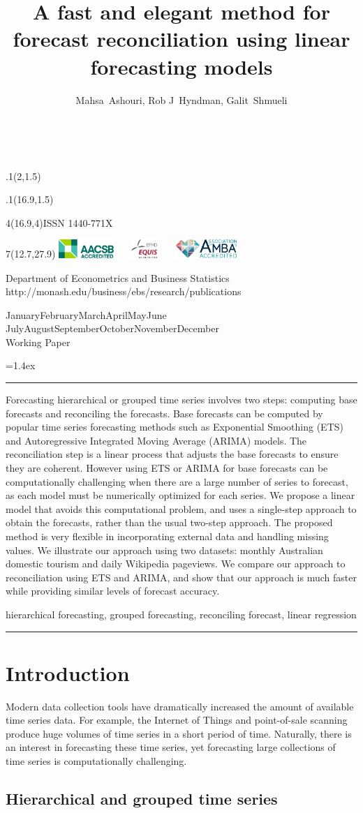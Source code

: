 \documentclass[11pt,a4paper,]{article}
\title{A fast and elegant method for forecast reconciliation using linear forecasting models}
\author{Mahsa~Ashouri, Rob J~Hyndman, Galit~Shmueli}
\date{\sf\Date~\Month~\Year}
\makeatletter
\def\Date{\number\day}
\def\Month{\ifcase\month\or
 January\or February\or March\or April\or May\or June\or
 July\or August\or September\or October\or November\or December\fi}
\def\Year{\number\year}
\def\showjel{{\large\textsf{\textbf{JEL classification:}}~\@jel}}
\def\cover{{\sffamily\setcounter{page}{0}
        \thispagestyle{empty}
        \placefig{2}{1.5}{width=5cm}{monash2}
        \placefig{16.9}{1.5}{width=2.1cm}{MBusSchool}
        \begin{textblock}{4}(16.9,4)ISSN 1440-771X\end{textblock}
        \begin{textblock}{7}(12.7,27.9)\hfill
        \includegraphics[height=0.7cm]{AACSB}~~~
        \includegraphics[height=0.7cm]{EQUIS}~~~
        \includegraphics[height=0.7cm]{AMBA}
        \end{textblock}
        \vspace*{2cm}
        \begin{center}\Large
        Department of Econometrics and Business Statistics\\[.5cm]
        \footnotesize http://monash.edu/business/ebs/research/publications
        \end{center}\vspace{2cm}
        \begin{center}
        \fbox{\parbox{14cm}{\begin{onehalfspace}\centering\Huge\vspace*{0.3cm}
                \textsf{\textbf{\expandafter{\@title}}}\vspace{1cm}\par
                \LARGE\@author\end{onehalfspace}
        }}
        \end{center}
        \vfill
                \begin{center}\Large
                \Month~\Year\\[1cm]
                Working Paper \@wp
        \end{center}\vspace*{2cm}}}
\def\pageone{{\sffamily\setstretch{1}%
        \thispagestyle{empty}%
        \vbox to \textheight{%
        \raggedright\baselineskip=1.2cm
     {\fontsize{24.88}{30}\sffamily\textbf{\expandafter{\@title}}}
        \vspace{2cm}\par
        \hspace{1cm}\parbox{14cm}{\sffamily\large\@addresses}\vspace{1cm}\vfill
        \hspace{1cm}{\large\Date~\Month~\Year}\\[1cm]
        \hspace{1cm}\showjel\vss}}}
\def\blindtitle{{\sffamily
     \thispagestyle{plain}\raggedright\baselineskip=1.2cm
     {\fontsize{24.88}{30}\sffamily\textbf{\expandafter{\@title}}}\vspace{1cm}\par
        }}
\def\titlepage{{\cover\newpage\pageone\newpage\blindtitle}}
\let\maketitle\titlepage
\newenvironment{keywords}{\par\vspace{0.5cm}\noindent{\sffamily\textbf{Keywords:}}}{\vspace{0.25cm}\par\hrule\vspace{0.5cm}\par}
\renewenvironment{abstract}{\begin{minipage}{\textwidth}\parskip=1.4ex\noindent
\hrule\vspace{0.1cm}\par{\sffamily\textbf{\abstractname}}\newline}
  {\end{minipage}}
\def\placefig#1#2#3#4{\begin{textblock}{.1}(#1,#2)\rlap{\texttt{[image: \#4]}}\end{textblock}}
\makeatother
\begin{document}
\maketitle
\begin{abstract}
Forecasting hierarchical or grouped time series involves two steps: computing base forecasts and reconciling the forecasts. Base forecasts can be computed by popular time series forecasting methods such as Exponential Smoothing (ETS) and Autoregressive Integrated Moving Average (ARIMA) models. The reconciliation step is a linear process that adjusts the base forecasts to ensure they are coherent. However using ETS or ARIMA for base forecasts can be computationally challenging when there are a large number of series to forecast, as each model must be numerically optimized for each series. We propose a linear model that avoids this computational problem, and uses a single-step approach to obtain the forecasts, rather than the usual two-step approach. The proposed method is very flexible in incorporating external data and handling missing values. We illustrate our approach using two datasets: monthly Australian domestic tourism and daily Wikipedia pageviews. We compare our approach to reconciliation using ETS and ARIMA, and show that our approach is much faster while providing similar levels of forecast accuracy.
\end{abstract}
\begin{keywords}
hierarchical forecasting, grouped forecasting, reconciling forecast, linear regression
\end{keywords}

\hypertarget{introduction}{%
\section{Introduction}\label{introduction}}

Modern data collection tools have dramatically increased the amount of available time series data. For example, the Internet of Things and point-of-sale scanning produce huge volumes of time series in a short period of time. Naturally, there is an interest in forecasting these time series, yet forecasting large collections of time series is computationally challenging.

\hypertarget{hierarchical-and-grouped-time-series}{%
\subsection{Hierarchical and grouped time series}\label{hierarchical-and-grouped-time-series}}
\end{document}
